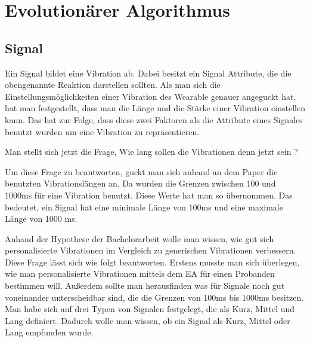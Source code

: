 
\section{Evolution{\"a}rer Algorithmus}

\subsection{Signal}
Ein Signal bildet eine Vibration ab. Dabei besitzt ein Signal Attribute, die die obengenannte Reaktion darstellen sollten. Als man sich die Einstellungsm{\"o}glichkeiten einer Vibration des Wearable genauer angeguckt hat, hat man festgestellt, dass man die L{\"a}nge und die St{\"a}rke einer Vibration einstellen kann. Das hat zur Folge, dass diese zwei Faktoren als die Attribute eines Signales benutzt wurden um eine Vibration zu repr{\"a}sentieren.

Man stellt sich jetzt die Frage,
Wie lang sollen die Vibrationen denn jetzt sein ? 

Um diese Frage zu beantworten, guckt man sich anhand an dem Paper \cite{pescara2016ruttelflug} die benutzten Vibrationsl{\"a}ngen an. Da wurden die Grenzen zwischen 100 und 1000ms f{\"u}r eine Vibration benutzt. Diese Werte hat man so {\"u}bernommen. Das bedeutet, ein Signal hat eine minimale L{\"a}nge von 100ms und eine maximale L{\"a}nge von 1000 ms. 

Anhand der Hypothese der Bachelorarbeit wolle man wissen, wie gut sich personalisierte Vibrationen im Vergleich zu generischen Vibrationen verbessern. Diese Frage l{\"a}sst sich wie folgt beantworten. Erstens musste man sich {\"u}berlegen, wie man personalisierte Vibrationen mittels dem EA f{\"u}r einen Probanden bestimmen will.
Au{\ss}erdem sollte man herausfinden was f{\"u}r Signale noch gut voneinander unterscheidbar sind, die die Grenzen von 100ms bis 1000ms besitzen.
Man habe sich auf drei Typen von Signalen festgelegt, die als Kurz, Mittel und Lang definiert. Dadurch wolle man wissen, ob ein Signal als Kurz, Mittel oder Lang empfunden wurde.

